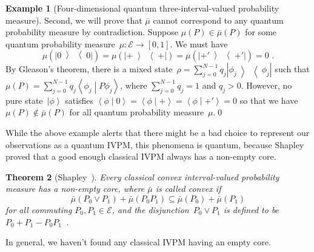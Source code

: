 \documentclass[english,reprint, aps, prl,superscriptaddress, showpacs,
showkeys]{revtex4-1}
\theoremstyle{plain}
\newtheorem{thm}{Theorem}
\theoremstyle{definition}
\newtheorem{example}[thm]{Example}
\newcommand{\events}{\ensuremath{\mathcal{E}}}
\newcommand{\ket}[1]{{\left\vert{#1}\right\rangle}}
\newcommand{\op}[2]{\ensuremath{\left\vert{#1}\middle\rangle\middle\langle{#2}\right\vert}}
\newcommand{\proj}[1]{\op{#1}{#1}}
\newcommand{\ps}{\texttt{+}}
\newcommand{\ip}[2]{\ensuremath{\left\langle{#1}\middle\vert{#2}\right\rangle}}
\begin{document}
\begin{example}[Four-dimensional quantum three-interval-valued probability
measure]
Second, we will prove that $\bar{\mu}$ cannot correspond to any quantum
probability measure by contradiction. Suppose $\mu(P)\in\bar{\mu}(P)$
for some quantum probability measure~$\mu:\events\rightarrow\left[0,1\right]$.
We must have 
\begin{equation}
\mu(\proj{0})=\mu(\proj{\ps})=\mu(\proj{\ps'})=0\textrm{ .}\label{eq:probability-zero-on-states}
\end{equation}
By Gleason's theorem, there is a mixed state~$\rho=\sum_{j=0}^{N-1}q_{j}\proj{\phi_{j}}$
such that $\mu\left(P\right)=\sum_{j=0}^{N-1}q_{j}\ip{\phi_{j}}{P\phi_{j}}$,
where $\sum_{j=0}^{N-1}q_{j}=1$ and $q_{j}>0$. However, no pure
state~$\ket{\phi}$ satisfies $\ip{\phi}{0}=\ip{\phi}{\ps}=\ip{\phi}{\ps'}=0$
so that we have $\mu(P)\notin\bar{\mu}(P)$ for all quantum probability
measure~$\mu$.\qed\end{example}

While the above example alerts that there might be a bad choice to
represent our observations as a quantum IVPM, this phenomena is quantum,
because Shapley proved that a good enough classical IVPM always has
a non-empty core. \begin{thm}[Shapley~\citep{Shapley1971,Grabisch2016}]\label{thm:Shapley}Every
classical convex interval-valued probability measure has a non-empty
core, where $\bar{\mu}$ is called convex if 
\begin{equation}
\bar{\mu}\left(P_{0}\vee P_{1}\right)+\bar{\mu}\left(P_{0}P_{1}\right)\subseteq\bar{\mu}\left(P_{0}\right)+\bar{\mu}\left(P_{1}\right)\label{eq:QuantumInterval-valuedProbability-Convex}
\end{equation}
for all commuting $P_{0},P_{1}\in\events$, and the \emph{disjunction}~$P_{0}\vee P_{1}$
is defined to be $P_{0}+P_{1}-P_{0}P_{1}$~\citep{Griffiths2003}.\end{thm}
In general, we haven't found any classical IVPM having an empty core. 


\end{document}
